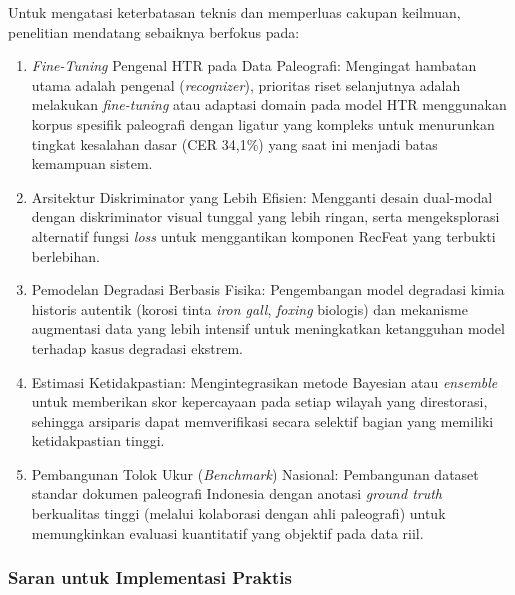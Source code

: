 \documentclass[12pt,a4paper]{article}
\begin{document}
Untuk mengatasi keterbatasan teknis dan memperluas cakupan keilmuan, penelitian mendatang sebaiknya berfokus pada:
\begin{enumerate}[leftmargin=1.5em, labelsep=0.5em, itemindent=0pt, noitemsep, topsep=0pt, partopsep=0pt]
  \item \textit{Fine-Tuning} Pengenal HTR pada Data Paleografi: Mengingat hambatan utama adalah pengenal (\textit{recognizer}), prioritas riset selanjutnya adalah melakukan \textit{fine-tuning} atau adaptasi domain pada model HTR menggunakan korpus spesifik paleografi dengan ligatur yang kompleks untuk menurunkan tingkat kesalahan dasar (CER 34,1\%) yang saat ini menjadi batas kemampuan sistem.

  \item Arsitektur Diskriminator yang Lebih Efisien: Mengganti desain dual-modal dengan diskriminator visual tunggal yang lebih ringan, serta mengeksplorasi alternatif fungsi \textit{loss} untuk menggantikan komponen RecFeat yang terbukti berlebihan.

  \item Pemodelan Degradasi Berbasis Fisika: Pengembangan model degradasi kimia historis autentik (korosi tinta \textit{iron gall}, \textit{foxing} biologis) dan mekanisme augmentasi data yang lebih intensif untuk meningkatkan ketangguhan model terhadap kasus degradasi ekstrem.

  \item Estimasi Ketidakpastian: Mengintegrasikan metode Bayesian atau \textit{ensemble} untuk memberikan skor kepercayaan pada setiap wilayah yang direstorasi, sehingga arsiparis dapat memverifikasi secara selektif bagian yang memiliki ketidakpastian tinggi.

  \item Pembangunan Tolok Ukur (\textit{Benchmark}) Nasional: Pembangunan dataset standar dokumen paleografi Indonesia dengan anotasi \textit{ground truth} berkualitas tinggi (melalui kolaborasi dengan ahli paleografi) untuk memungkinkan evaluasi kuantitatif yang objektif pada data riil.
\end{enumerate}



\subsubsection{Saran untuk Implementasi Praktis}
\label{subsubsec:saran-praktis}
\end{document}
